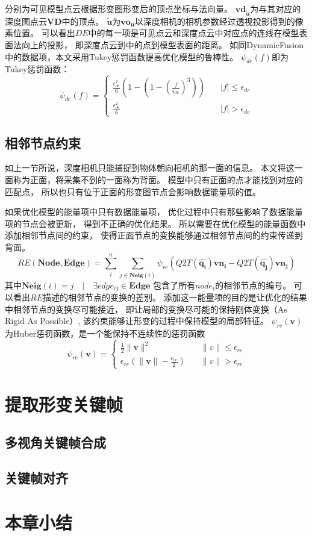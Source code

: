 分别为可见模型点云根据形变图形变后的顶点坐标与法向量。
$\bm{vd_{\widetilde{\bm{u}}}}$为与其对应的深度图点云$\bm{VD}$中的顶点。
$\widetilde{\bm{u}}$为$\bm{vo_u}$以深度相机的相机参数经过透视投影得到的像素位置。
可以看出$DE$中的每一项是可见点云和深度点云中对应点的连线在模型表面法向上的投影，
即深度点云到中的点到模型表面的距离。
如同DynamicFusion中的数据项，本文采用Tukey惩罚函数提高优化模型的鲁棒性。
$\psi_{de}(f)$即为Tukey惩罚函数：
\begin{equation}
    \psi_{de}(f)= 
    \begin{cases}
        \frac{\epsilon_{de}^2}{6}(1-(1-(\frac{f}{\epsilon_{de}})^3))
        &\quad |f|\leq\epsilon_{de}\\

        \frac{\epsilon_{de}^2}{6}
        &\quad |f|>\epsilon_{de}
        
    \end{cases}
\end{equation}
\subsection{相邻节点约束}
如上一节所说，深度相机只能捕捉到物体朝向相机的那一面的信息。
本文将这一面称为正面，将采集不到的一面称为背面。
模型中只有正面的点才能找到对应的匹配点，
所以也只有位于正面的形变图节点会影响数据能量项的值。

如果优化模型的能量项中只有数据能量项，
优化过程中只有那些影响了数据能量项的节点会被更新，
得到不正确的优化结果。
所以需要在优化模型的能量函数中添加相邻节点间的约束，
使得正面节点的变换能够通过相邻节点间的约束传递到背面。
\begin{equation}
    RE(\bm{Node},\bm{Edge})=
    \sum_{i}^{n}
    \sum_{j \in \bm{Neig}(i)}
    \psi_{re}(
            Q2T(
                \hat{\bm{q_i}}
            )
            \bm{vn_i}
            -
            Q2T(
                \hat{\bm{q_j}}
            )
            \bm{vn_j}
        )
\end{equation}
其中$\bm{Neig}(i)={j \quad | \quad \exists edge_{ij} \in \bm{Edge}}$
包含了所有$node_i$的相邻节点的编号。
可以看出$RE$描述的相邻节点的变换的差别。
添加这一能量项的目的是让优化的结果中相邻节点的变换尽可能接近，
即让局部的变换尽可能的保持刚体变换（As Rigid As Possible）,
该约束能够让形变的过程中保持模型的局部特征。
$\psi_{re}(\bm{v})$为Huber惩罚函数，是一个能保持不连续性的惩罚函数
\begin{equation}
    \psi_{re}(\bm{v}) = 
    \begin{cases}
        \frac{1}{2}\|\bm{v}\|^2
        &\quad \|v\| \leq \epsilon_{re}\\
        \epsilon_{re}(\|\bm{v}\|-\frac{\epsilon_{re}}{2})
        &\quad \|v\| > \epsilon_{re}
    \end{cases}
\end{equation}
\section{提取形变关键帧}
\subsection{多视角关键帧合成}
\subsection{关键帧对齐}
\section{本章小结}